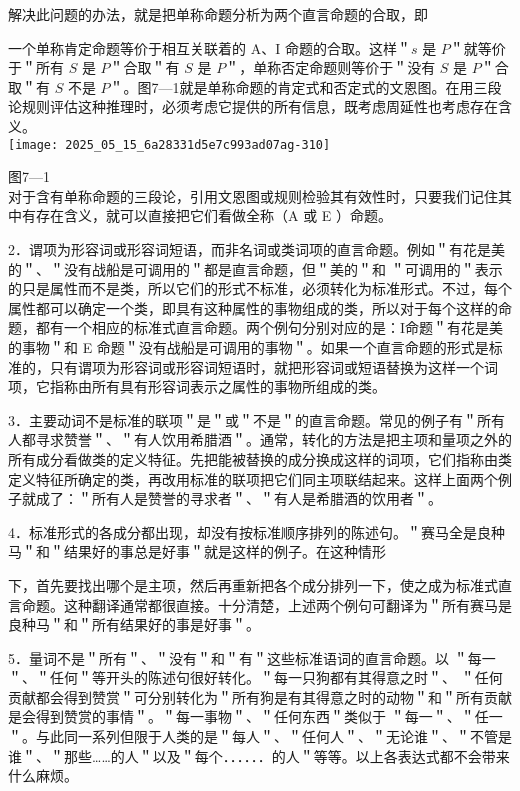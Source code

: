 解决此问题的办法，就是把单称命题分析为两个直言命题的合取，即

一个单称肯定命题等价于相互关联着的 A、I 命题的合取。这样＂$s$ 是 $P$＂就等价于＂所有 $S$ 是 $P$＂合取＂有 $S$ 是 $P$＂，单称否定命题则等价于＂没有 $S$ 是 $P$＂合取＂有 $S$ 不是 $P$＂。图7—1就是单称命题的肯定式和否定式的文恩图。在用三段论规则评估这种推理时，必须考虑它提供的所有信息，既考虑周延性也考虑存在含义。\\
\texttt{[image: 2025\_05\_15\_6a28331d5e7c993ad07ag-310]}

图7—1\\
对于含有单称命题的三段论，引用文恩图或规则检验其有效性时，只要我们记住其中有存在含义，就可以直接把它们看做全称（A 或 E ）命题。

2．谓项为形容词或形容词短语，而非名词或类词项的直言命题。例如＂有花是美的＂、＂没有战船是可调用的＂都是直言命题，但＂美的＂和 ＂可调用的＂表示的只是属性而不是类，所以它们的形式不标准，必须转化为标准形式。不过，每个属性都可以确定一个类，即具有这种属性的事物组成的类，所以对于每个这样的命题，都有一个相应的标准式直言命题。两个例句分别对应的是：I命题＂有花是美的事物＂和 E 命题＂没有战船是可调用的事物＂。如果一个直言命题的形式是标准的，只有谓项为形容词或形容词短语时，就把形容词或短语替换为这样一个词项，它指称由所有具有形容词表示之属性的事物所组成的类。

3．主要动词不是标准的联项＂是＂或＂不是＂的直言命题。常见的例子有＂所有人都寻求赞誉＂、＂有人饮用希腊酒＂。通常，转化的方法是把主项和量项之外的所有成分看做类的定义特征。先把能被替换的成分换成这样的词项，它们指称由类定义特征所确定的类，再改用标准的联项把它们同主项联结起来。这样上面两个例子就成了：＂所有人是赞誉的寻求者＂、＂有人是希腊酒的饮用者＂。

4．标准形式的各成分都出现，却没有按标准顺序排列的陈述句。＂赛马全是良种马＂和＂结果好的事总是好事＂就是这样的例子。在这种情形

下，首先要找出哪个是主项，然后再重新把各个成分排列一下，使之成为标准式直言命题。这种翻译通常都很直接。十分清楚，上述两个例句可翻译为＂所有赛马是良种马＂和＂所有结果好的事是好事＂。

5．量词不是＂所有＂、＂没有＂和＂有＂这些标准语词的直言命题。以 ＂每一＂、＂任何＂等开头的陈述句很好转化。＂每一只狗都有其得意之时＂、 ＂任何贡献都会得到赞赏＂可分别转化为＂所有狗是有其得意之时的动物＂和＂所有贡献是会得到赞赏的事情＂。＂每一事物＂、＂任何东西＂类似于 ＂每一＂、＂任一＂。与此同一系列但限于人类的是＂每人＂、＂任何人＂、＂无论谁＂、＂不管是谁＂、＂那些……的人＂以及＂每个．．．．．．的人＂等等。以上各表达式都不会带来什么麻烦。

